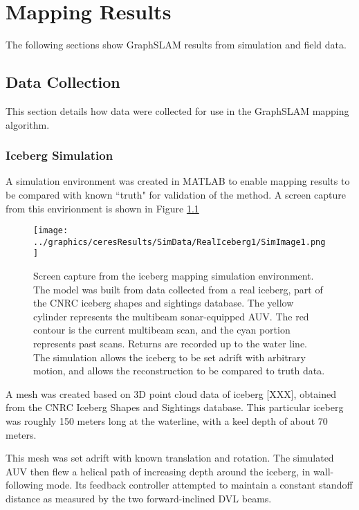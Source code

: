 
\chapter{Mapping Results}
\label{ch.Results}

The following sections show GraphSLAM results from simulation and field data. 

\section{Data Collection}

This section details how data were collected for use in the GraphSLAM mapping algorithm.

\subsection{Iceberg Simulation}

A simulation environment was created in MATLAB to enable mapping results to be compared with known ``truth" for validation of the method. A screen capture from this envirionment is shown in Figure \ref{fig:IcebergSim}
 
 \begin{figure}[!htb]
   \centering
   \texttt{[image: ../graphics/ceresResults/SimData/RealIceberg1/SimImage1.png]} %
   \caption{Screen capture from the iceberg mapping simulation environment. The model was built from data collected from a real iceberg, part of the CNRC iceberg shapes and sightings database. The yellow cylinder represents the multibeam sonar-equipped AUV. The red contour is the current multibeam scan, and the cyan portion represents past scans. Returns are recorded up to the water line. The simulation allows the iceberg to be set adrift with arbitrary motion, and allows the reconstruction to be compared to truth data.}
   \label{fig:IcebergSim}
\end{figure}

A mesh was created based on 3D point cloud data of iceberg [XXX], obtained from the CNRC Iceberg Shapes and Sightings database. \cite{?} This particular iceberg was roughly 150 meters long at the waterline, with a keel depth of about 70 meters.

This mesh was set adrift with known translation and rotation. The simulated AUV then flew a helical path of increasing depth around the iceberg, in wall-following mode. Its feedback controller attempted to maintain a constant standoff distance as measured by the two forward-inclined DVL beams.

